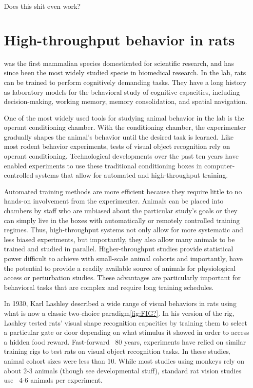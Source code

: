 \begin{savequote}[75mm]
Does this shit even work?
\end{savequote}

\chapter{High-throughput behavior in rats}
 was the first mammalian species domesticated for scientific research\cite{Jacob199}, and has since been the most widely studied specie in biomedical research. In the lab, rats can be trained to perform cognitively demanding tasks. They have a long history as laboratory models for the behavioral study of cognitive capacities, including decision-making\cite{Brunton2013, REFREF}, working memory\cite{REFREF}, memory consolidation\cite{REF}, and spatial navigation\cite{REFREF}. 

One of the most widely used tools for studying animal behavior in the lab is the operant conditioning chamber\cite{REFREF}. With the conditioning chamber, the experimenter gradually shapes the animal's behavior until the desired task is learned. Like most rodent behavior experiments, tests of visual object recognition rely on operant conditioning. Technological developments over the past ten years have enabled experiments to use these traditional conditioning boxes in computer-controlled systems that allow for automated and high-throughput training. 

Automated training methods are more efficient because they require little to no hands-on involvement from the experimenter. Animals can be placed into chambers by staff who are unbiased about the particular study's goals or they can simply live in the boxes with automatically or remotely controlled training regimes\cite{MouseAcademy, Raj, Brody}. Thus, high-throughput systems not only allow for more systematic and less biased experiments, but importantly, they also allow many animals to be trained and studied in parallel. Higher-throughput studies provide statistical power difficult to achieve with small-scale animal cohorts and importantly, have the potential to provide a readily available source of animals for physiological access or perturbation studies. These advantages are particularly important for behavioral tasks that are complex and require long training schedules.

In 1930, Karl Lashley\cite{Lashley1930} described a wide range of visual behaviors in rats using what is now a classic two-choice paradigm\ref{fig:FIG?}. In his version of the rig, Lashley tested rats' visual shape recognition capacities by training them to select a particular gate or door depending on what stimulus it showed in order to access a hidden food reward. Fast-forward ~80 years, experiments have relied on similar training rigs to test rats on visual object recognition tasks\cite{Zoccolan2009, ETC}. In these studies, animal cohort sizes were less than 10. While most studies using monkeys rely on about 2-3 animals (though see \cite{REFREF} developmental stuff), standard rat vision studies use ~4-6 animals per experiment\cite{REFREF}. 

